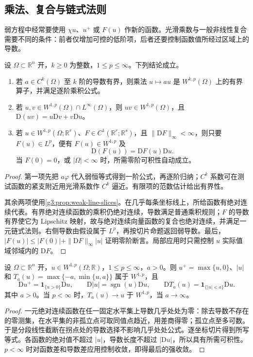 \subsection{乘法、复合与链式法则}
\label{g3:subsec:1102:03}
弱方程中经常要使用 \(\chi u\)、\(u^+\) 或 \(F(u)\) 作新的函数。光滑乘数与一般非线性复合需要不同的条件：前者仅增加可控的低阶项，后者还要控制函数值所经过区域上的导数。

\begin{proposition}\label{g3:prop:sobolev-product-chain}
	设 \(\Omega\subset\mathbb R^n\) 开，\(k\ge0\) 为整数，\(1\le p\le\infty\)。下列结论成立。
	\begin{enumerate}
		\item 若 \(a\in C^k(\Omega)\) 至 \(k\) 阶的导数有界，则乘法 \(u\mapsto au\) 是 \(W^{k,p}(\Omega)\) 上的有界算子，并满足逐阶乘积公式。
		\item 若 \(u,v\in W^{1,p}(\Omega)\cap L^\infty(\Omega)\)，则 \(uv\in W^{1,p}(\Omega)\)，且 \(\mathrm D(uv)=u\mathrm Dv+v\mathrm Du\)。
		\item 若 \(u\in W^{1,p}(\Omega;\mathbb R^r)\)、\(F\in C^1(\mathbb R^r;\mathbb R^s)\)，且 \(\|\mathrm DF\|_\infty<\infty\)，则只要 \(F(u)\in L^p\)，便有 \(F(u)\in W^{1,p}\) 及
		\[
			\mathrm D(F(u))=\mathrm DF(u)\mathrm Du.
		\]
		当 \(F(0)=0\)，或 \(|\Omega|<\infty\) 时，所需零阶可积性自动成立。
	\end{enumerate}
\end{proposition}
\begin{proof}
	第一项先把 \(a\varphi\) 代入弱恒等式得到一阶公式，再逐阶归纳；\(C^k\) 系数可在测试函数的紧支附近用光滑系数作 \(C^k\) 逼近。有限项的范数估计给出有界性。

	其余两项使用\cref{g3:prop:weak-line-slices}。在几乎每条坐标线上，所给函数有绝对连续代表。有界绝对连续函数的乘积仍绝对连续，导数满足普通乘积规则；\(F\) 的导数有界使它为 Lipschitz 映射，故与绝对连续向量函数的复合也绝对连续，并满足一元链式法则。右侧导数由假设属于 \(L^p\)，再按切片命题返回弱导数。最后，\(|F(u)|\le|F(0)|+\|\mathrm DF\|_\infty|u|\) 证明零阶断言。局部应用时只需控制 \(u\) 实际值域邻域内的 \(\mathrm DF\)。
\end{proof}

\begin{proposition}\label{g3:prop:sobolev-truncation}
	设 \(\Omega\subset\mathbb R^n\) 开，\(u\in W^{1,p}(\Omega;\mathbb R)\)，\(1\le p\le\infty\)，\(a>0\)。则 \(u^+=\max\{u,0\}\)、\(|u|\) 和 \(T_a(u)=\max\{-a,\min\{u,a\}\}\) 属于 \(W^{1,p}\)，且
	\[
		\mathrm D u^+=\mathbf1_{\{u>0\}}\mathrm Du,\qquad
		\mathrm D|u|=\operatorname{sgn}(u)\mathrm Du,\qquad
		\mathrm DT_a(u)=\mathbf1_{\{|u|<a\}}\mathrm Du.
	\]
	其中 \(a>0\)。当 \(p<\infty\) 时，\(T_a(u)\to u\) 于 \(W^{1,p}\)，当 \(a\to\infty\)。
\end{proposition}
\begin{proof}
	一元绝对连续函数在任一固定水平集上导数几乎处处为零：除去导数不存在的零测集，在水平集的非孤立点可取同值点趋近，用差商得零；孤立点至多可数。于是分段线性截断在拐点处的导数选择不影响几乎处处公式。逐坐标切片得到所写等式。各函数的绝对值不超过 \(|u|\)，导数长度不超过 \(|\mathrm Du|\)，所以具有所需可积性。\(p<\infty\) 时对函数差和导数差应用控制收敛，即得最后的强收敛。
\end{proof}

